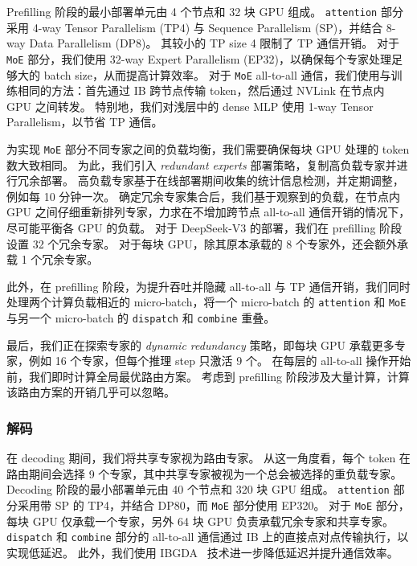 \documentclass[11pt, a4paper, logo, copyright, nonumbering]{deepseek}
\newcommand{\dsviii}{DeepSeek-V3}
\begin{document}
Prefilling 阶段的最小部署单元由 4 个节点和 32 块 GPU 组成。
\texttt{attention} 部分采用 4-way Tensor Parallelism (TP4) 与 Sequence Parallelism (SP)，并结合 8-way Data Parallelism (DP8)。
其较小的 TP size 4 限制了 TP 通信开销。
对于 \texttt{MoE} 部分，我们使用 32-way Expert Parallelism (EP32)，以确保每个专家处理足够大的 batch size，从而提高计算效率。
对于 \texttt{MoE} all-to-all 通信，我们使用与训练相同的方法：首先通过 IB 跨节点传输 token，然后通过 NVLink 在节点内 GPU 之间转发。
特别地，我们对浅层中的 dense MLP 使用 1-way Tensor Parallelism，以节省 TP 通信。

为实现 \texttt{MoE} 部分不同专家之间的负载均衡，我们需要确保每块 GPU 处理的 token 数大致相同。
为此，我们引入 \textit{redundant experts} 部署策略，复制高负载专家并进行冗余部署。
高负载专家基于在线部署期间收集的统计信息检测，并定期调整，例如每 10 分钟一次。
确定冗余专家集合后，我们基于观察到的负载，在节点内 GPU 之间仔细重新排列专家，力求在不增加跨节点 all-to-all 通信开销的情况下，尽可能平衡各 GPU 的负载。
对于 \dsviii{} 的部署，我们在 prefilling 阶段设置 32 个冗余专家。
对于每块 GPU，除其原本承载的 8 个专家外，还会额外承载 1 个冗余专家。

此外，在 prefilling 阶段，为提升吞吐并隐藏 all-to-all 与 TP 通信开销，我们同时处理两个计算负载相近的 micro-batch，将一个 micro-batch 的 \texttt{attention} 和 \texttt{MoE} 与另一个 micro-batch 的 \texttt{dispatch} 和 \texttt{combine} 重叠。

最后，我们正在探索专家的 \textit{dynamic redundancy} 策略，即每块 GPU 承载更多专家，例如 16 个专家，但每个推理 step 只激活 9 个。
在每层的 all-to-all 操作开始前，我们即时计算全局最优路由方案。
考虑到 prefilling 阶段涉及大量计算，计算该路由方案的开销几乎可以忽略。

\subsubsection{解码}

在 decoding 期间，我们将共享专家视为路由专家。
从这一角度看，每个 token 在路由期间会选择 9 个专家，其中共享专家被视为一个总会被选择的重负载专家。
Decoding 阶段的最小部署单元由 40 个节点和 320 块 GPU 组成。
\texttt{attention} 部分采用带 SP 的 TP4，并结合 DP80，而 \texttt{MoE} 部分使用 EP320。
对于 \texttt{MoE} 部分，每块 GPU 仅承载一个专家，另外 64 块 GPU 负责承载冗余专家和共享专家。
\texttt{dispatch} 和 \texttt{combine} 部分的 all-to-all 通信通过 IB 上的直接点对点传输执行，以实现低延迟。
此外，我们使用 IBGDA~\citep{nvidia_ibgda} 技术进一步降低延迟并提升通信效率。
\end{document}
